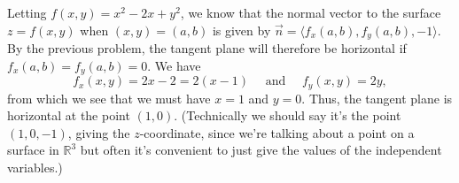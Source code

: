 \documentclass[letterpaper,12pt]{article}
\newcommand{\R}{\mathbb{R}}
\begin{document}
\begin{enumerate}
\bigskip

Letting $f(x,y)=x^2-2x+y^2$, we know that the normal vector to the surface $z=f(x,y)$ when $(x,y)=(a,b)$ is given by $\vec{n} = \langle f_x(a,b), f_y(a,b), -1\rangle$. By the previous problem, the tangent plane will therefore be horizontal if $f_x(a,b)=f_y(a,b)=0$. We have
\[
 f_x(x,y) = 2x-2=2(x-1) \quad \text{ and } \quad f_y(x,y) = 2y,
\]
from which we see that we must have $x=1$ and $y=0$. Thus, the tangent plane is horizontal at the point $(1,0)$. (Technically we should say it's the point $(1,0,-1)$, giving the $z$-coordinate, since we're talking about a point on a surface in $\R^3$ but often it's convenient to just give the values of the independent variables.)
\end{enumerate}
\end{document}
